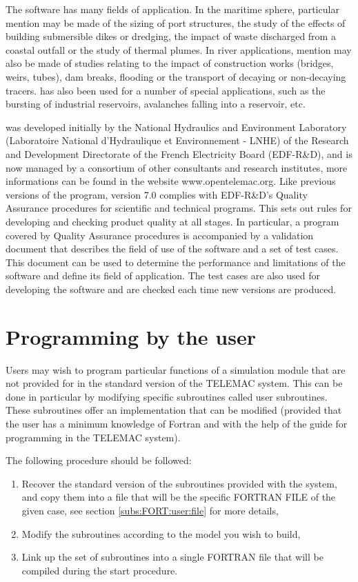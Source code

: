  The software has many fields of application. In the maritime sphere, particular mention may be made of the sizing of port structures, the study of the effects of building submersible dikes or dredging, the impact of waste discharged from a coastal outfall or the study of thermal plumes. In river applications, mention may also be made of studies relating to the impact of construction works (bridges, weirs, tubes), dam breaks, flooding or the transport of decaying or non-decaying tracers.  has also been used for a number of special applications, such as the bursting of industrial reservoirs, avalanches falling into a reservoir, etc.

  was developed initially by the National Hydraulics and Environment Laboratory (Laboratoire National d'Hydraulique et Environnement - LNHE) of the Research and Development Directorate of the French Electricity Board (EDF-R\&D), and is now managed by a consortium of other consultants and research institutes, more informations can be found in the website www.opentelemac.org. Like previous versions of the program, version 7.0 complies with EDF-R\&D's Quality Assurance procedures for scientific and technical programs. This sets out rules for developing and checking product quality at all stages. In particular, a program covered by Quality Assurance procedures is accompanied by a validation document  that describes the field of use of the software and a set of test cases. This document can be used to determine the performance and limitations of the software and define its field of application. The test cases are also used for developing the software and are checked each time new versions are produced.


\section{Programming by the user}

 Users may wish to program particular functions of a simulation module that are not provided for in the standard version of the TELEMAC system. This can be done in particular by modifying specific subroutines called user subroutines. These subroutines offer an implementation that can be modified (provided that the user has a minimum knowledge of Fortran and with the help of the guide for programming in the TELEMAC system).

 The following procedure should be followed:

\begin{enumerate}
\item  Recover the standard version of the subroutines provided with the system, and copy them into a file that will be the specific FORTRAN FILE of the given case, see section \ref{subs:FORT:user:file} for more details,

\item  Modify the subroutines according to the model you wish to build,

\item  Link up the set of subroutines into a single FORTRAN file that will be compiled during the  start procedure.
\end{enumerate}

